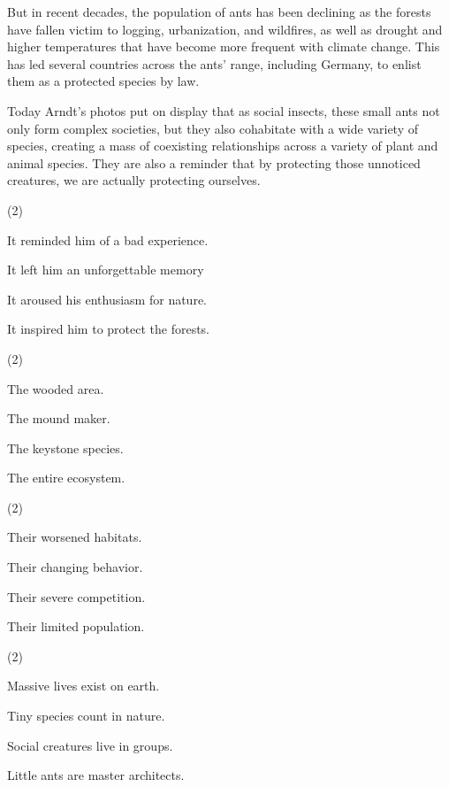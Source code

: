 \documentclass{英语试卷}
\begin{document}
\par But in recent decades, the population of ants has been declining as the forests have fallen victim to logging, urbanization, and wildfires, as well as drought and higher temperatures that have become more frequent with climate change. This has led several countries across the ants' range, including Germany, to enlist them as a protected species by law.\par
\par Today Arndt's photos put on display that as social insects, these small ants not only form complex societies, but they also cohabitate with a wide variety of species, creating a mass of coexisting relationships across a variety of plant and animal species. They are also a reminder that by protecting those unnoticed creatures, we are actually protecting ourselves.\par
{}
\begin{choices}(2)
  \item It reminded him of a bad experience.
  \item It left him an unforgettable memory
  \item It aroused his enthusiasm for nature.
  \item It inspired him to protect the forests.
\end{choices}
\begin{choices}(2)
  \item The wooded area.
  \item The mound maker.
  \item The keystone species.
  \item The entire ecosystem.
\end{choices}
\begin{choices}(2)
  \item Their worsened habitats.
  \item Their changing behavior.
  \item Their severe competition.
  \item Their limited population.
\end{choices}
\begin{choices}(2)
  \item Massive lives exist on earth.
  \item Tiny species count in nature.
  \item Social creatures live in groups.
  \item Little ants are master architects.
\end{choices}
\end{document}
